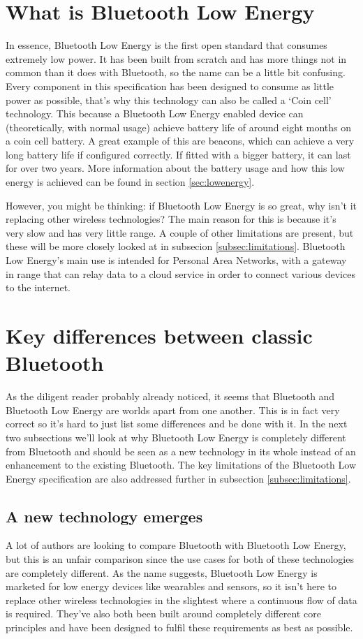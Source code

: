 \documentclass[pdftex,a4paper,12pt,twoside]{report}
\begin{document}
\newpage{}

\section{What is Bluetooth Low Energy}
\label{sec:whatis}
In essence, Bluetooth Low Energy is the first open standard that consumes extremely low power. It has been built from scratch and has more things not in common than it does with Bluetooth, so the name can be a little bit confusing. Every component in this specification has been designed to consume as little power as possible, that's why this technology can also be called a `Coin cell' technology. This because a Bluetooth Low Energy enabled device can (theoretically, with normal usage) achieve battery life of around eight months on a coin cell battery. A great example of this are beacons, which can achieve a very long battery life if configured correctly. If fitted with a bigger battery, it can last for over two years. More information about the battery usage and how this low energy is achieved can be found in section \ref{sec:lowenergy}.

However, you might be thinking: if Bluetooth Low Energy is so great, why isn't it replacing other wireless technologies? The main reason for this is because it's very slow and has very little range. A couple of other limitations are present, but these will be more closely looked at in subsecion \ref{subsec:limitations}. Bluetooth Low Energy's main use is intended for Personal Area Networks, with a gateway in range that can relay data to a cloud service in order to connect various devices to the internet.

\section{Key differences between classic Bluetooth}
\label{sec:differencesclassic}
As the diligent reader probably already noticed, it seems that Bluetooth and Bluetooth Low Energy are worlds apart from one another. This is in fact very correct so it's hard to just list some differences and be done with it. In the next two subsections we'll look at why Bluetooth Low Energy is completely different from Bluetooth and should be seen as a new technology in its whole instead of an enhancement to the existing Bluetooth. The key limitations of the Bluetooth Low Energy specification are also addressed further in subsection \ref{subsec:limitations}.

\subsection{A new technology emerges}
\label{subsec:newtechnology}
A lot of authors are looking to compare Bluetooth with Bluetooth Low Energy, but this is an unfair comparison since the use cases for both of these technologies are completely different. As the name suggests, Bluetooth Low Energy is marketed for low energy devices like wearables and sensors, so it isn't here to replace other wireless technologies in the slightest where a continuous flow of data is required. They've also both been built around completely different core principles and have been designed to fulfil these requirements as best as possible.
\end{document}
